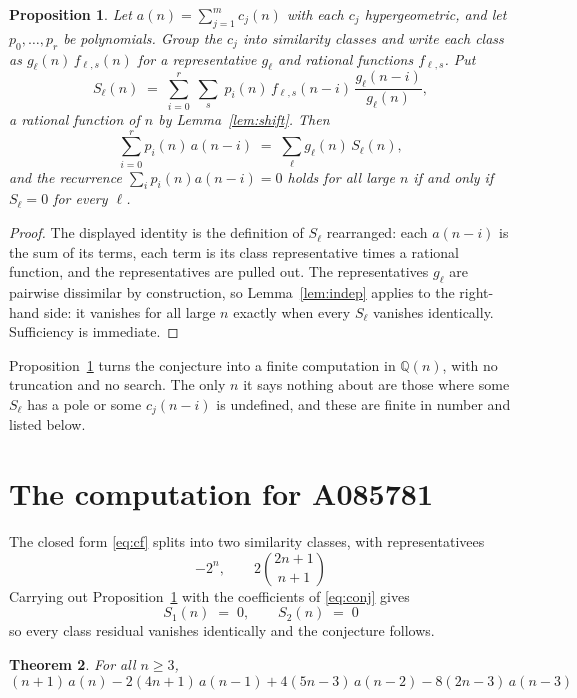 \documentclass[11pt,a4paper]{article}
\theoremstyle{plain}
\newtheorem{theorem}{Theorem}
\newtheorem{proposition}[theorem]{Proposition}
\theoremstyle{definition}
\begin{document}
\begin{proposition}\label{prop:main}
Let $a(n)=\sum_{j=1}^{m}c_{j}(n)$ with each $c_{j}$ hypergeometric, and let
$p_{0},\dots,p_{r}$ be polynomials. Group the $c_{j}$ into similarity classes and write
each class as $g_{\ell}(n)\,f_{\ell,s}(n)$ for a representative $g_{\ell}$ and rational
functions $f_{\ell,s}$. Put
\[
S_{\ell}(n)\;=\;\sum_{i=0}^{r}\;\sum_{s}\;p_{i}(n)\,f_{\ell,s}(n-i)\,
\frac{g_{\ell}(n-i)}{g_{\ell}(n)} ,
\]
a rational function of $n$ by Lemma~\ref{lem:shift}. Then
\[
\sum_{i=0}^{r}p_{i}(n)\,a(n-i)\;=\;\sum_{\ell}g_{\ell}(n)\,S_{\ell}(n),
\]
and the recurrence $\sum_{i}p_{i}(n)a(n-i)=0$ holds for all large $n$ if and only if
$S_{\ell}=0$ for every $\ell$.
\end{proposition}

\begin{proof}
The displayed identity is the definition of $S_{\ell}$ rearranged: each $a(n-i)$ is the
sum of its terms, each term is its class representative times a rational function, and the
representatives are pulled out. The representatives $g_{\ell}$ are pairwise dissimilar by
construction, so Lemma~\ref{lem:indep} applies to the right-hand side: it vanishes for all
large $n$ exactly when every $S_{\ell}$ vanishes identically. Sufficiency is immediate.
\end{proof}

Proposition~\ref{prop:main} turns the conjecture into a finite computation in
$\mathbb{Q}(n)$, with no truncation and no search. The only $n$ it says nothing about are
those where some $S_{\ell}$ has a pole or some $c_{j}(n-i)$ is undefined, and these are
finite in number and listed below.

\section{The computation for A085781}

The closed form \eqref{eq:cf} splits into two similarity classes, with
representativees
\[
- 2^{n},\qquad 2 {\binom{2 n + 1}{n + 1}}
\]
Carrying out Proposition~\ref{prop:main} with the coefficients of \eqref{eq:conj} gives
\[
S_{1}(n)\;=\;0,\qquad S_{2}(n)\;=\;0
\]
so every class residual vanishes identically and the conjecture follows.

\begin{theorem}
For all $n\ge 3$,
\[
(n + 1)\,a(n) -  2 \left(4 n + 1\right)\,a(n-1) + 4 \left(5 n - 3\right)\,a(n-2) -  8 \left(2 n - 3\right)\,a(n-3)
\]
\end{theorem}
\end{document}
